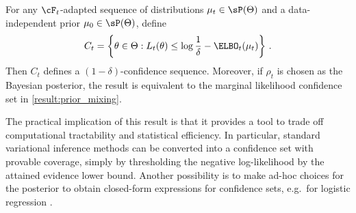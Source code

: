 \begin{theorem}\label{result:elbo_confidence_set}
    For any $\cF_t$-adapted sequence of distributions $\mu_t \in \sP(\Theta)$ and a data-independent prior $\mu_0 \in \sP(\Theta)$, define
    \begin{align*}
		 C_t = \left\{\theta \in \Theta : L_t(\theta) \leq  \log \frac{1}{\delta} - \ELBO_t(\mu_t)  \right\} \,.
	\end{align*}
    Then $C_t$ defines a $(1-\delta)$-confidence sequence. Moreover, if $\rho_t$ is chosen as the Bayesian posterior, the result is equivalent to the marginal likelihood confidence set in \cref{result:prior_mixing}.
\end{theorem}
The practical implication of this result is that it provides a tool to trade off computational tractability and statistical efficiency. In particular, standard variational inference methods can be converted into a confidence set with provable coverage, simply by thresholding the negative log-likelihood by the attained evidence lower bound. Another possibility is to make ad-hoc choices for the posterior to obtain closed-form expressions for confidence sets, e.g.~for logistic regression \citep{lee2024unified}. 
